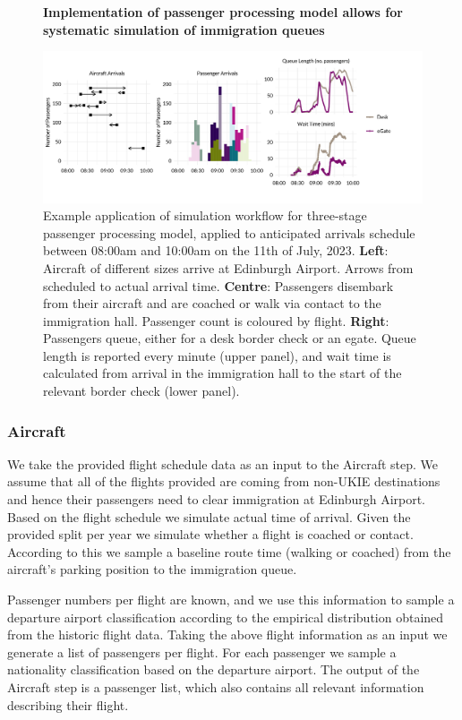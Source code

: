 \documentclass[10pt]{article}
\newcommand*{\figuretitle}[1]{%
    {\centering%
    \textbf{#1}%
    \par\medskip}%
}
\begin{document}
\begin{figure}[!ht]
    \centering
    \figuretitle{Implementation of passenger processing model allows for systematic simulation of immigration queues}
    \includegraphics[width=1.1\textwidth]{figures/workflow_fig.png}
     \caption{Example application of simulation workflow for three-stage passenger processing model, applied to anticipated arrivals schedule between 08:00am and 10:00am on the 11th of July, 2023. \textbf{Left}: Aircraft of different sizes arrive at Edinburgh Airport. Arrows from scheduled to actual arrival time. \textbf{Centre}: Passengers disembark from their aircraft and are coached or walk via contact to the immigration hall. Passenger count is coloured by flight. \textbf{Right}: Passengers queue, either for a desk border check or an \gls{egate}. Queue length is reported every minute (upper panel), and wait time is calculated from arrival in the immigration hall to the start of the relevant border check (lower panel).} \label{fig:workflow_fig}
\end{figure}

\subsubsection{Aircraft}
We take the provided flight schedule data as an input to the Aircraft step. We assume that all of the flights provided are coming from non-UKIE destinations and hence their passengers need to clear immigration at Edinburgh Airport. Based on the flight schedule we simulate actual time of arrival. Given the provided split per year we simulate whether a flight is coached or contact. According to this we sample a baseline route time (walking or coached) from the aircraft's parking position to the immigration queue. 

Passenger numbers per flight are known, and we use this information to sample a departure airport classification according to the empirical distribution obtained from the historic flight data. Taking the above flight information as an input we generate a list of passengers per flight. For each passenger we sample a nationality classification based on the departure airport. The output of the Aircraft step is a passenger list, which also contains all relevant information describing their flight.
\end{document}

